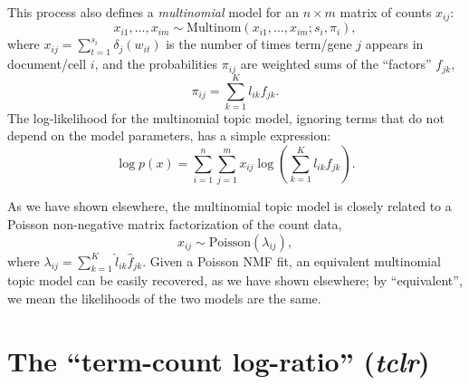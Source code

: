 \documentclass[final]{siamart171218}
\begin{document}
This process also defines a {\em multinomial} model for an $n \times
m$ matrix of counts $x_{ij}$:
\begin{equation}
x_{i1}, \ldots, x_{im} \sim
\mathrm{Multinom}(x_{i1}, \ldots, x_{im}; s_i, \pi_i),
\end{equation}
where $x_{ij} = \sum_{t=1}^{s_i} \delta_j(w_{it})$ is the number of
times term/gene $j$ appears in document/cell $i$, and the
probabilities $\pi_{ij}$ are weighted sums of the ``factors''
$f_{jk}$,
\begin{equation}
\pi_{ij} = \sum_{k=1}^K l_{ik} f_{jk}.
\end{equation}
The log-likelihood for the multinomial topic model, ignoring terms
that do not depend on the model parameters, has a simple expression:
\begin{equation}
\log p(x) = \sum_{i=1}^n \sum_{j=1}^m
x_{ij} \log({\textstyle \sum_{k=1}^K l_{ik} f_{jk}}).
\end{equation}

As we have shown elsewhere, the multinomial topic model is closely
related to a Poisson non-negative matrix factorization of the count
data,
\begin{equation}
x_{ij} \sim \mathrm{Poisson}(\lambda_{ij}),
\end{equation}
where $\lambda_{ij} = \sum_{k=1}^K \hat{l}_{ik} \hat{f}_{jk}$. Given a
Poisson NMF fit, an equivalent multinomial topic model can be easily
recovered, as we have shown elsewhere; by ``equivalent'', we mean the
likelihoods of the two models are the same.

\section{The ``term-count log-ratio'' ({\em tclr})}
\end{document}
